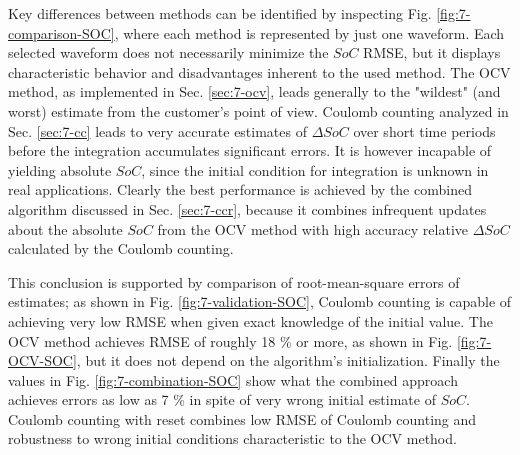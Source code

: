 Key differences between methods can be identified by inspecting Fig. \ref{fig:7-comparison-SOC}, where each method is represented by just one waveform. Each selected waveform does not necessarily minimize the $SoC$ RMSE, but it displays characteristic behavior and disadvantages inherent to the used method. The OCV method, as implemented in Sec. \ref{sec:7-ocv}, leads generally to the "wildest" (and worst) estimate from the customer's point of view. Coulomb counting analyzed in Sec. \ref{sec:7-cc} leads to very accurate estimates of $\Delta SoC$ over short time periods before the integration accumulates significant errors. It is however incapable of yielding absolute $SoC$, since the initial condition for integration is unknown in real applications. Clearly the best performance is achieved by the combined algorithm discussed in Sec. \ref{sec:7-ccr}, because it combines infrequent updates about the absolute $SoC$ from the OCV method with high accuracy relative $\Delta SoC$ calculated by the Coulomb counting.

This conclusion is supported by comparison of root-mean-square errors of estimates; as shown in Fig. \ref{fig:7-validation-SOC}, Coulomb counting is capable of achieving very low RMSE when given exact knowledge of the initial value. The OCV method achieves RMSE of roughly 18 \% or more, as shown in Fig. \ref{fig:7-OCV-SOC}, but it does not depend on the algorithm's initialization. Finally the values in Fig. \ref{fig:7-combination-SOC} show what the combined approach achieves errors as low as 7 \% in spite of very wrong initial estimate of $SoC$. Coulomb counting with reset combines low RMSE of Coulomb counting and robustness to wrong initial conditions characteristic to the OCV method.
